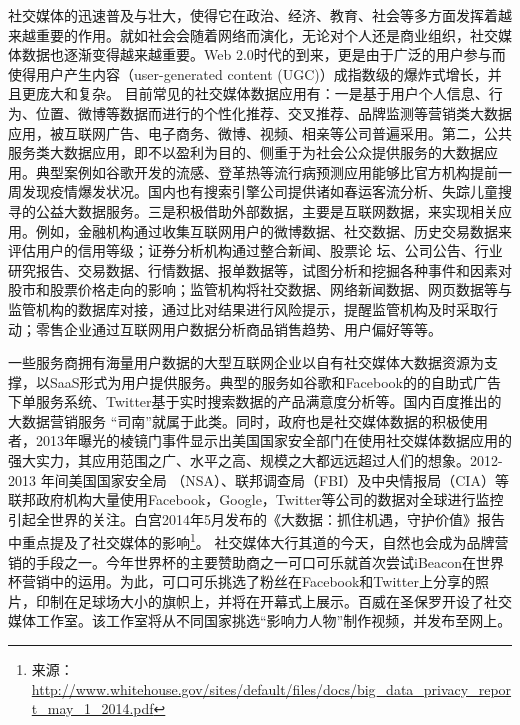 社交媒体的迅速普及与壮大，使得它在政治、经济、教育、社会等多方面发挥着越来越重要的作用。就如社会会随着网络而演化，无论对个人还是商业组织，社交媒体数据也逐渐变得越来越重要。Web 2.0时代的到来，更是由于广泛的用户参与而使得用户产生内容（user-generated content (UGC)）成指数级的爆炸式增长，并且更庞大和复杂。
目前常见的社交媒体数据应用有：一是基于用户个人信息、行为、位置、微博等数据而进行的个性化推荐、交叉推荐、品牌监测等营销类大数据应用，被互联网广告、电子商务、微博、视频、相亲等公司普遍采用。第二，公共服务类大数据应用，即不以盈利为目的、侧重于为社会公众提供服务的大数据应用。典型案例如谷歌开发的流感、登革热等流行病预测应用能够比官方机构提前一周发现疫情爆发状况。国内也有搜索引擎公司提供诸如春运客流分析、失踪儿童搜寻的公益大数据服务。三是积极借助外部数据，主要是互联网数据，来实现相关应用。例如，金融机构通过收集互联网用户的微博数据、社交数据、历史交易数据来评估用户的信用等级；证券分析机构通过整合新闻、股票论 坛、公司公告、行业研究报告、交易数据、行情数据、报单数据等，试图分析和挖掘各种事件和因素对股市和股票价格走向的影响；监管机构将社交数据、网络新闻数据、网页数据等与监管机构的数据库对接，通过比对结果进行风险提示，提醒监管机构及时采取行动；零售企业通过互联网用户数据分析商品销售趋势、用户偏好等等。

一些服务商拥有海量用户数据的大型互联网企业以自有社交媒体大数据资源为支撑，以SaaS形式为用户提供服务。典型的服务如谷歌和Facebook的的自助式广告下单服务系统、Twitter基于实时搜索数据的产品满意度分析等。国内百度推出的大数据营销服务 “司南”就属于此类。同时，政府也是社交媒体数据的积极使用者，2013年曝光的棱镜门事件显示出美国国家安全部门在使用社交媒体数据应用的强大实力，其应用范围之广、水平之高、规模之大都远远超过人们的想象。2012-2013 年间美国国家安全局 （NSA）、联邦调查局（FBI）及中央情报局（CIA）等联邦政府机构大量使用Facebook，Google，Twitter等公司的数据对全球进行监控引起全世界的关注。白宫2014年5月发布的《大数据：抓住机遇，守护价值》报告中重点提及了社交媒体的影响\footnote{来源：\url{http://www.whitehouse.gov/sites/default/files/docs/big_data_privacy_report_may_1_2014.pdf}}。
社交媒体大行其道的今天，自然也会成为品牌营销的手段之一。今年世界杯的主要赞助商之一可口可乐就首次尝试iBeacon在世界杯营销中的运用。为此，可口可乐挑选了粉丝在Facebook和Twitter上分享的照片，印制在足球场大小的旗帜上，并将在开幕式上展示。百威在圣保罗开设了社交媒体工作室。该工作室将从不同国家挑选“影响力人物”制作视频，并发布至网上。

